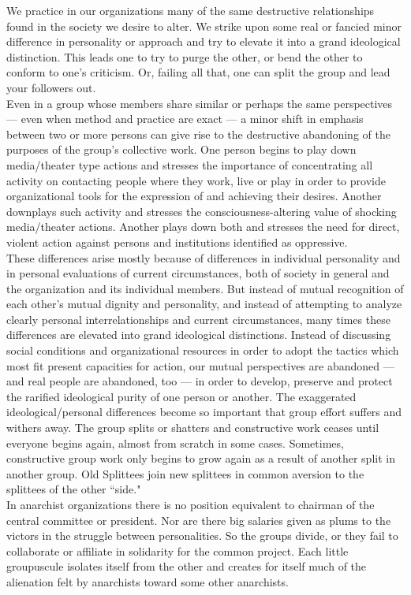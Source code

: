 \documentclass[12pt, onecolumn, letterpaper, oneside]{book}
\begin{document}
We practice in our organizations many of the same destructive relationships found in the society we desire to alter. We strike upon some real or fancied minor difference in personality or approach and try to elevate it into a grand ideological distinction. This leads one to try to purge the other, or bend the other to conform to one's criticism. Or, failing all that, one can split the group and lead your followers out.\\
Even in a group whose members share similar or perhaps the same perspectives --- even when method and practice are exact --- a minor shift in emphasis between two or more persons can give rise to the destructive abandoning of the purposes of the group's collective work. One person begins to play down media/theater type actions and stresses the importance of concentrating all activity on contacting people where they work, live or play in order to provide organizational tools for the expression of and achieving their desires. Another downplays such activity and stresses the consciousness-altering value of shocking media/theater actions. Another plays down both and stresses the need for direct, violent action against persons and institutions identified as oppressive.\\
These differences arise mostly because of differences in individual personality and in personal evaluations of current circumstances, both of society in general and the organization and its individual members. But instead of mutual recognition of each other's mutual dignity and personality, and instead of attempting to analyze clearly personal interrelationships and current circumstances, many times these differences are elevated into grand ideological distinctions. Instead of discussing social conditions and organizational resources in order to adopt the tactics which most fit present capacities for action, our mutual perspectives are abandoned --- and real people are abandoned, too --- in order to develop, preserve and protect the rarified ideological purity of one person or another. The exaggerated ideological/personal differences become so important that group effort suffers and withers away. The group splits or shatters and constructive work ceases until everyone begins again, almost from scratch in some cases. Sometimes, constructive group work only begins to grow again as a result of another split in another group. Old Splittees  join new splittees in common aversion to the splittees of the other ``side."\\
In anarchist organizations there is no position equivalent to chairman of the central committee or president. Nor are there big salaries given as plums to the victors in the struggle between personalities. So the groups divide, or they fail to collaborate or affiliate in solidarity for the common project. Each little groupuscule isolates itself from the other and creates for itself much of the alienation felt by anarchists toward some other anarchists.\\
\end{document}
